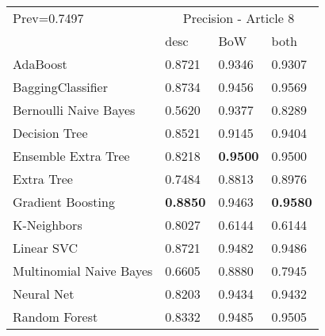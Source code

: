 \begin{tabular}{|l|l|l|l| }
\hline
Prev=0.7497 &  \multicolumn{3}{c|}{Precision - Article 8} \\
\cline{2-4} & desc & BoW & both \\ \hline
AdaBoost                & 0.8721 & 0.9346 & 0.9307\\
BaggingClassifier       & 0.8734 & 0.9456 & 0.9569\\
Bernoulli Naive Bayes   & 0.5620 & 0.9377 & 0.8289\\
Decision Tree           & 0.8521 & 0.9145 & 0.9404\\
Ensemble Extra Tree     & 0.8218 & {\bf 0.9500} & 0.9500\\
Extra Tree              & 0.7484 & 0.8813 & 0.8976\\
Gradient Boosting       & {\bf 0.8850} & 0.9463 & {\bf 0.9580}\\
K-Neighbors             & 0.8027 & 0.6144 & 0.6144\\
Linear SVC              & 0.8721 & 0.9482 & 0.9486\\
Multinomial Naive Bayes & 0.6605 & 0.8880 & 0.7945\\
Neural Net              & 0.8203 & 0.9434 & 0.9432\\
Random Forest           & 0.8332 & 0.9485 & 0.9505\\
\hline
\end{tabular}